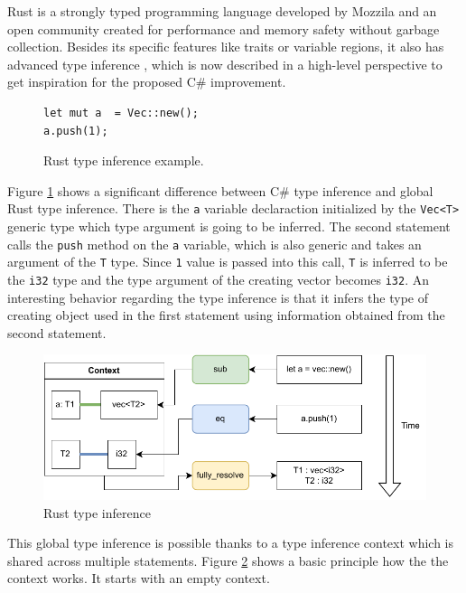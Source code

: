 Rust is a strongly typed programming language developed by Mozzila and an open community created for performance and memory safety without garbage collection. 
Besides its specific features like traits or variable regions, it also has advanced type inference \cite{online:rustTypeInference}, which is now described in a high-level perspective to get inspiration for the proposed C\# improvement.
\par
\begin{figure}[h]
\begin{lstlisting}
let mut a  = Vec::new();
a.push(1);
\end{lstlisting}
\caption{Rust type inference example.}
\label{img17:rustCodeExample}
\end{figure}
Figure \ref{img17:rustCodeExample} shows a significant difference between C\# type inference and global Rust type inference.
There is the \texttt{a} variable declaraction initialized by the \texttt{Vec<T>} generic type which type argument is going to be inferred.
The second statement calls the \texttt{push} method on the \texttt{a} variable, which is also generic and takes an argument of the \texttt{T} type.
Since \texttt{1} value is passed into this call, \texttt{T} is inferred to be the \texttt{i32} type and the type argument of the creating vector becomes \texttt{i32}.
An interesting behavior regarding the type inference is that it infers the type of creating object used in the first statement using information obtained from the second statement.
\begin{figure}[h]
\centering
\includegraphics[width=140mm]{./img/RustTypeInference.pdf}
\caption{Rust type inference}
\label{img18:rustTypeInference}
\end{figure}
\par
\par
This global type inference is possible thanks to a type inference context which is shared across multiple statements. 
Figure \ref{img18:rustTypeInference} shows a basic principle how the the context works. 
It starts with an empty context. 
